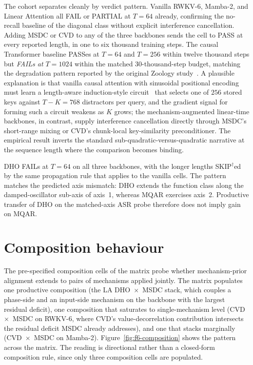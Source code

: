 The cohort separates cleanly by verdict pattern. Vanilla
RWKV-6, Mamba-2, and Linear Attention all FAIL or PARTIAL at
$T = 64$ already, confirming the no-recall baseline of the
diagonal class without explicit interference cancellation.
Adding MSDC or CVD to any of the three backbones sends the cell
to PASS at every reported length, in one to six thousand
training steps. The causal Transformer baseline PASSes at
$T = 64$ and $T = 256$ within twelve thousand steps but
\textit{FAILs at $T = 1024$} within the matched 30-thousand-step
budget, matching the degradation pattern reported by the
original Zoology study~\cite{arora2023zoology}. A plausible
explanation is that vanilla causal attention with sinusoidal
positional encoding must learn a length-aware
induction-style circuit~\cite{olsson2022induction} that selects
one of $256$ stored keys against $T - K = 768$ distractors per
query, and the gradient signal for forming such a circuit
weakens as $K$ grows; the mechanism-augmented linear-time
backbones, in contrast, supply interference cancellation
directly through MSDC's short-range mixing or CVD's chunk-local
key-similarity preconditioner. The empirical result inverts the
standard sub-quadratic-versus-quadratic narrative at the
sequence length where the comparison becomes binding.

DHO FAILs at $T = 64$ on all three backbones, with the longer
lengths SKIP$^{\dagger}$ed by the same propagation rule that
applies to the vanilla cells. The pattern matches the predicted
axis mismatch: DHO extends the function class along the
damped-oscillator sub-axis of axis~1, whereas MQAR exercises
axis~2. Productive transfer of DHO on the matched-axis ASR probe
therefore does not imply gain on MQAR.

\section{Composition behaviour}\label{sec:experiments:composition}

The pre-specified composition cells of the matrix probe whether
mechanism-prior alignment extends to pairs of mechanisms applied
jointly. The matrix populates one productive composition (the LA
DHO~$\times$~MSDC stack, which couples a phase-side and an
input-side mechanism on the backbone with the largest residual
deficit), one composition that saturates to single-mechanism level
(CVD~$\times$~MSDC on RWKV-6, where CVD's value-decorrelation
contribution intersects the residual deficit MSDC already
addresses), and one that stacks marginally
(CVD~$\times$~MSDC on Mamba-2). Figure~\ref{fig:f6-composition}
shows the pattern across the matrix. The reading is directional
rather than a closed-form composition rule, since only three
composition cells are populated.

